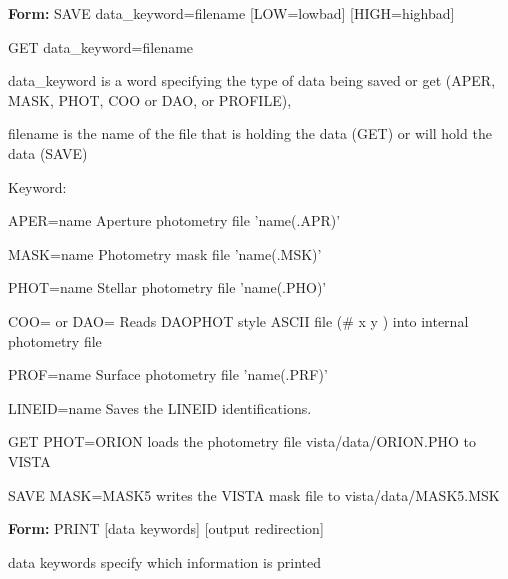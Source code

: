 {\newpage\clearpage
{}%
\begin{command}
  \item[\textbf{Form: } SAVE data\_keyword=filename {[LOW=lowbad]} 
       {[HIGH=highbad]}\hfill]{}
  \item[GET  data\_keyword=filename\hfill]{}
  \item[data\_keyword]{is a word specifying the type of data
       being saved or get (APER, MASK, PHOT, COO or DAO, or PROFILE),}
  \item[filename]{is the name of the file that is holding
       the data (GET) or will hold the data (SAVE)}
\end{command}%
\lthtmlfigureZ
\lthtmlcheckvsize\clearpage}

{\newpage\clearpage
{}%
\begin{command}
  \item[Keyword:\hfill]{}
  \item[APER=name]{Aperture photometry file 'name(.APR)'}
  \item[MASK=name]{Photometry mask file 'name(.MSK)'}
  \item[PHOT=name]{Stellar photometry file 'name(.PHO)'}
  \item[COO= or DAO=]{Reads DAOPHOT style ASCII file (\# x y ) into
       internal photometry file}
  \item[PROF=name]{Surface photometry file 'name(.PRF)'}
  \item[LINEID=name]{Saves the LINEID identifications.}
\end{command}%
\lthtmlfigureZ
\lthtmlcheckvsize\clearpage}

{\newpage\clearpage
{}%
\begin{example}
  \item[GET PHOT=ORION\hfill]{loads the photometry file
       vista/data/ORION.PHO to VISTA}
  \item[SAVE MASK=MASK5\hfill]{writes the VISTA mask file
       to vista/data/MASK5.MSK}
\end{example}%
\lthtmlfigureZ
\lthtmlcheckvsize\clearpage}

{\newpage\clearpage
{}%
\begin{command}
  \item[\textbf{Form: } PRINT {[data keywords]} {[output redirection]}\hfill]
  \item[data keywords]{specify which information is printed}
\end{command}%
\lthtmlfigureZ
\lthtmlcheckvsize\clearpage}

